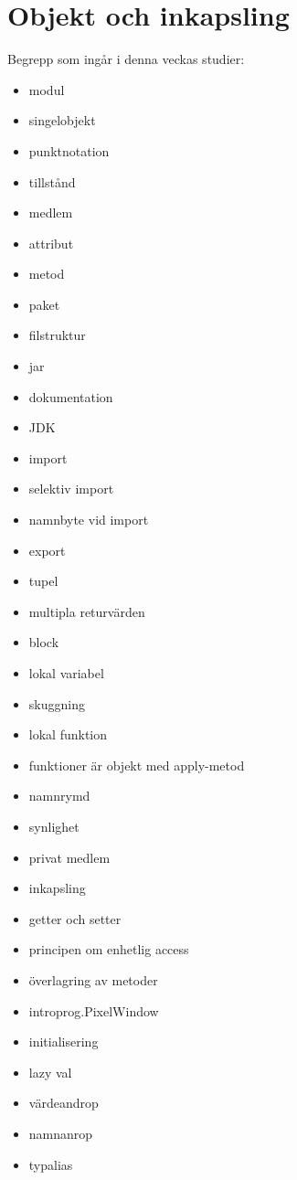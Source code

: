 \chapter{Objekt och inkapsling}\label{chapter:W04}
Begrepp som ingår i denna veckas studier:
\begin{multicols}{2}\begin{itemize}[noitemsep,label={$\square$},leftmargin=*]
\item modul
\item singelobjekt
\item punktnotation
\item tillstånd
\item medlem
\item attribut
\item metod
\item paket
\item filstruktur
\item jar
\item dokumentation
\item JDK
\item import
\item selektiv import
\item namnbyte vid import
\item export
\item tupel
\item multipla returvärden
\item block
\item lokal variabel
\item skuggning
\item lokal funktion
\item funktioner är objekt med apply-metod
\item namnrymd
\item synlighet
\item privat medlem
\item inkapsling
\item getter och setter
\item principen om enhetlig access
\item överlagring av metoder
\item introprog.PixelWindow
\item initialisering
\item lazy val
\item värdeandrop
\item namnanrop
\item typalias\end{itemize}\end{multicols}
